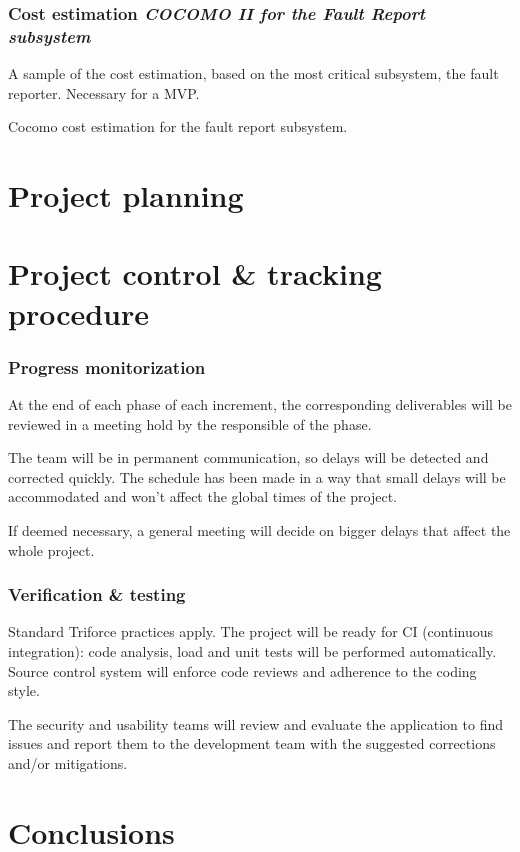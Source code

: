 \documentclass[10pt, compress,usetitleprogressbar,aspectratio=1610]{beamer}
\begin{document}
\begin{frame}
\frametitle{Cost estimation \hfill \emph{COCOMO II for the Fault Report subsystem}}
A sample of the cost estimation, based on the most critical subsystem, the fault reporter. Necessary for a MVP.

\begin{table}[hbtp]

\caption{Cocomo cost estimation for the fault report subsystem.}
\label{tblFaultReportCost}
\end{table}
\end{frame}

\section{Project planning}

\section{Project control \& tracking procedure}

\begin{frame}
\frametitle{Progress monitorization}
At the end of each phase of each increment, the corresponding deliverables will be reviewed in a meeting hold by the responsible of the phase.

The team will be in permanent communication, so delays will be detected and corrected quickly. The schedule has been made in a way that small delays will be accommodated and won't affect the global times of the project.

If deemed necessary, a general meeting will decide on bigger delays that affect the whole project.
\end{frame}

\begin{frame}
\frametitle{Verification \& testing}
Standard Triforce practices apply. The project will be ready for CI (continuous integration): code analysis, load and unit tests will be performed automatically. Source control system will enforce code reviews and adherence to the coding style.

The security and usability teams will review and evaluate the application to find issues and report them to the development team with the suggested corrections and/or mitigations.
\end{frame}

\section{Conclusions}
\end{document}
